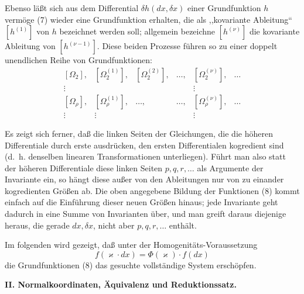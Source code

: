 \documentclass[11pt]{article}
\begin{document}
Ebenso läßt sich aus dem Differential \(\delta h(dx,\delta x)\) einer
Grundfunktion \(h\) vermöge (7) wieder eine Grundfunktion erhalten, die
als ,,kovariante Ableitung`` \([h^{(1)}]\) von \(h\) bezeichnet werden
soll; allgemein bezeichne \([h^{(\nu)}]\) die kovariante Ableitung von
\([h^{(\nu-1)}]\). Diese beiden Prozesse führen so zu einer doppelt
unendlichen Reihe von Grundfunktionen:
\begin{equation}
\begin{array}{cccccc}
[\Omega_2], & [\Omega_2^{(1)}], & [\Omega_2^{(2)}], & \ldots,
& [\Omega_2^{(\nu)}], & \ldots\\
\vdots &&&& \vdots&\\
{}[\Omega_\rho], & [\Omega_\rho^{(1)}], & \ldots, & \ldots,
& [\Omega_\rho^{(\nu)}], & \ldots\\
\vdots & \vdots &&& \vdots&
\end{array}
\tag{8}
\end{equation}

Es zeigt sich ferner, daß die linken Seiten der Gleichungen, die die
höheren Differentiale durch erste ausdrücken, den ersten Differentialen
kogredient sind (d.~h. denselben linearen Transformationen unterliegen).
Führt man also statt der höheren Differentiale diese linken Seiten
\(p,q,r,\ldots\) als Argumente der Invariante ein, so hängt diese außer
von den Ableitungen nur von zu einander kogredienten Größen ab. Die
oben angegebene Bildung der Funktionen (8) kommt einfach auf die
Einführung dieser neuen Größen hinaus; jede Invariante geht dadurch in
eine Summe von Invarianten über, und man greift daraus diejenige heraus,
die gerade \(dx,\delta x\), nicht aber \(p,q,r,\ldots\) enthält.

Im folgenden wird gezeigt, daß unter der Homogenitäts-Voraussetzung
\[
f(\varkappa\cdot dx)=\Phi(\varkappa)\cdot f(dx)
\]
die Grundfunktionen (8) das gesuchte vollständige System erschöpfen.

\begin{center}
\textbf{II. Normalkoordinaten, Äquivalenz und Reduktionssatz.}
\end{center}
\end{document}
